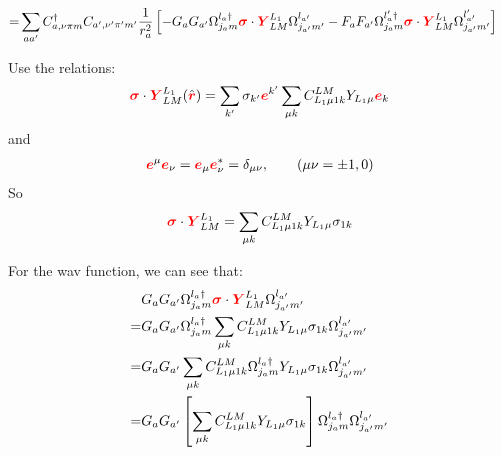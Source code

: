 \documentclass[a4paper]{article}
\newcommand{\no}{\nonumber}
\newcommand{\bmm}[1]{{\color{red}\bm{#1}}}
\begin{document}
\begin{align}
=&\sum_{aa'}C_{a,\nu\pi m}^{\dag}C_{a',\nu'\pi'm'}\frac{1}{r_{a}^{2}}\left[-G_{a}G_{a'}\Omega_{j_{a}m}^{l_{a}\dag}\bmm{\sigma}\cdot\bmm{Y}_{LM}^{L_{1}}\Omega_{j_{a'}m'}^{l_{a'}}-F_{a}F_{a'}\Omega_{j_{a}m}^{l_{a}'\dag}\bmm{\sigma}\cdot\bmm{Y}_{LM}^{L_{1}}\Omega_{j_{a'}m'}^{l_{a'}'}\right]
\end{align}

Use the relations:
\begin{align}
\bmm{\sigma}\cdot\bmm{Y}_{LM}^{L_{1}}(\hat{\bmm{r}})=\sum_{k'}\sigma_{k'}\bmm{e}^{k'}\sum_{\mu k}C_{L_{1}\mu1 k}^{LM}Y_{L_{1}\mu}\bmm{e}_{k}
\end{align}
and
\begin{align}
\bmm{e}^{\mu}\bmm{e}_{\nu}=\bmm{e}_{\mu}\bmm{e}_{\nu}^{*}=\delta_{\mu\nu}, \hspace{2em} \left(\mu\nu=\pm1,0\right)
\end{align}
So
\begin{align}
\bmm{\sigma}\cdot\bmm{Y}_{LM}^{L_{1}}=\sum_{\mu k}C_{L_{1}\mu1 k}^{LM}Y_{L_{1}\mu}\sigma_{1k}
\end{align}

For the wav function, we can see that:
\begin{align}
\no&G_{a}G_{a'}\Omega_{j_{a}m}^{l_{a}\dag}\bmm{\sigma}\cdot\bmm{Y}_{LM}^{L_{1}}\Omega_{j_{a'}m'}^{l_{a'}}\\
\no=&G_{a}G_{a'}\Omega_{j_{a}m}^{l_{a}\dag}\sum_{\mu k}C_{L_{1}\mu1k}^{LM}Y_{L_{1}\mu}\sigma_{1k}\Omega_{j_{a'}m'}^{l_{a'}}\\
\no=&G_{a}G_{a'}\sum_{\mu k}C_{L_{1}\mu1k}^{LM}\Omega_{j_{a}m}^{l_{a}\dag}Y_{L_{1}\mu}\sigma_{1k}\Omega_{j_{a'}m'}^{l_{a'}}\\
=&G_{a}G_{a'}\left[\sum_{\mu k}C_{L_{1}\mu1 k}^{LM }Y_{L_{1}\mu}\sigma_{1k}\right]\Omega_{j_{a}m}^{l_{a}\dag}\Omega_{j_{a'}m'}^{l_{a'}}
\end{align}
\end{document}
